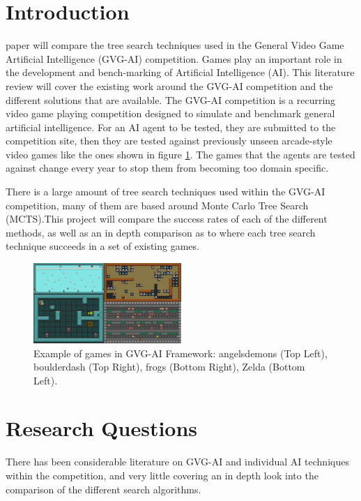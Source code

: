 \documentclass[journal]{IEEEtran}
\begin{document}
\section{Introduction}
	 paper will compare the tree search techniques used in the General Video Game Artificial Intelligence (GVG-AI) competition.  
	Games play an important role in the development and bench-marking of Artificial Intelligence (AI). This literature review will cover the existing work around the GVG-AI competition and the different solutions that are available.
	The GVG-AI competition is a recurring video game playing competition designed to simulate and benchmark general artificial intelligence. For an AI agent to be tested, they are submitted to the competition site, then they are tested against previously unseen arcade-style video games like the ones shown in figure \ref{fig:VGDL}. The games that the agents are tested against change every year to stop them from becoming too domain specific.

	There is a large amount of tree search techniques used within the GVG-AI competition, many of them are based around Monte Carlo Tree Search (MCTS).This project will compare the success rates of each of the different methods, as well as an in depth comparison as to where each tree search technique succeeds in a set of existing games.

\begin{figure}[h]
		    \centering
		    \includegraphics[width=0.5\textwidth]{VGDL2}
		    \caption{Example of games in GVG-AI Framework: angelsdemons (Top Left), boulderdash (Top Right), frogs (Bottom Right), Zelda (Bottom Left). }
		    \label{fig:VGDL}
		\end{figure}
		
\section{Research Questions}

	There has been considerable literature on GVG-AI and individual AI techniques within the competition, and very little covering an in depth look into the comparison of the different search algorithms.
\end{document}
